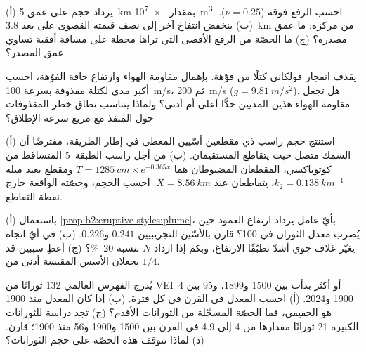 \begin{exercise}[$\star\star$]\label{exo:b2:eruptive-styles:8}
(أ) يزداد حجم  على عمق \qty{5}{km} بمقدار \qty{e7}{m^3}. احسب
الرفع فوقه ($\nu = 0.25$). (ب) ينخفض انتفاخ آخر إلى نصف قيمته القصوى
على بعد \qty{3.8}{km} من مركزه: ما عمق مصدره؟ (ج) ما الحصّة من
الرفع الأقصى التي تراها محطة على مسافة أفقية تساوي عمق
المصدر؟
\end{exercise}

\begin{exercise}[$\star\star$]\label{exo:b2:eruptive-styles:9}
يقذف انفجار فولكاني كتلًا من فوّهة. بإهمال مقاومة الهواء
وارتفاع حافة الفوّهة، احسب أكبر مدى لكتلة مقذوفة
بسرعة \qty{100}{m/s}، ثم \qty{200}{m/s} ($g = \qty{9.81}{m/s^2}$). هل تجعل مقاومة
الهواء هذين المديين حدًّا أعلى أم أدنى؟ ولماذا يتناسب نطاق
خطر المقذوفات حول المنفذ مع مربع سرعة الإطلاق؟
\end{exercise}

\begin{exercise}[$\star\star\star$]\label{exo:b2:eruptive-styles:10}
(أ) استنتج حجم راسب ذي مقطعين أسّيين المعطى في
إطار الطريقة، مفترضًا أن السمك متصل حيث يتقاطع المستقيمان. (ب) من أجل
راسب الطبقة~5 المتساقط من كوتوباكسي، المقطعان المضبوطان هما $T = \qty{1285}{cm}\times
e^{-0.365x}$ ومقطع بعيد ميله $k_2 = \qty{0.138}{km^{-1}}$، يتقاطعان عند
$X = \qty{8.56}{km}$. احسب الحجم، وحصّته الواقعة خارج نقطة
التقاطع.
\end{exercise}

\begin{exercise}[$\star\star\star$]\label{exo:b2:eruptive-styles:11}
(أ) باستعمال \cref{prop:b2:eruptive-styles:plume}، بأيّ عامل يزداد ارتفاع
العمود حين يُضرب معدل الثوران في 100؟ قارن بالأسّين
التجريبيين $0.241$ و$0.226$. (ب) في أيّ اتجاه يغيّر غلاف جوي أشدّ
تطبّقًا الارتفاعَ، وبكم إذا ازداد $N$ بنسبة
\qty{20}{\percent}؟ (ج) أعطِ سببين قد يجعلان الأسس المقيسة أدنى من
$1/4$.
\end{exercise}

\begin{exercise}[$\star\star\star$]\label{exo:b2:eruptive-styles:12}
يُدرج الفهرس العالمي 132 ثورانًا من VEI~4 أو أكثر بدأت بين 1500
و1899، و95 بين 1900 و2024. (أ) احسب المعدل في القرن في كل
فترة. (ب) إذا كان المعدل منذ 1900 هو الحقيقي، فما الحصّة المسجّلة من الثورانات
الأقدم؟ (ج) تجد دراسة للثورانات الكبيرة 21 ثورانًا
مقدارها من 4 إلى 4.9 في القرن بين 1500 و1900 و56 منذ 1900؛ قارن.
(د) لماذا تتوقف هذه الحصّة على حجم الثورانات؟
\end{exercise}

